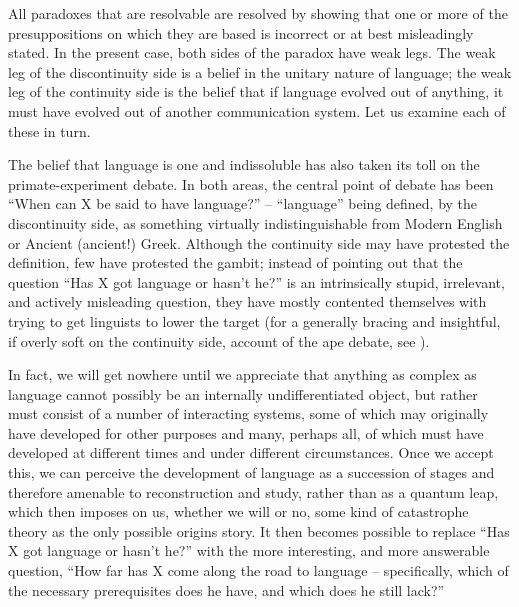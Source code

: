 All paradoxes that are resolvable are resolved by showing that one or more of the presuppositions on which they are based is incorrect or at best misleadingly stated. In the present case, both sides of the paradox have weak legs. The weak leg of the discontinuity side is a belief in the unitary nature of language; the weak leg of the continuity side is the belief that if language evolved out of anything, it must have evolved out of another communication system. Let us examine each of these in turn.

The belief that language is one and indissoluble has also taken its toll on the primate-experiment debate. In both areas, the central point of debate has been ``When can X be said to have language?'' -- ``language'' being defined, by the discontinuity side, as something virtually indistinguishable from Modern English or Ancient (ancient!) Greek. Although the continuity side may have protested the definition, few have protested the gambit; instead of pointing out that the question ``Has X got language or hasn't he?'' is an intrinsically stupid, irrelevant, and actively misleading question, they have mostly contented themselves with trying to get linguists to lower the target (for a generally bracing and insightful, if overly soft on the continuity side, account of the ape debate, see \citealt{Linden1974}).

In fact, we will get nowhere until we appreciate that anything as complex as language cannot possibly be an internally undifferentiated object, but rather must consist of a number of interacting systems,
some of which may originally have developed for other purposes and many, perhaps all, of which must have developed at different times and under different circumstances. Once we accept this, we can per\-ceive the development of language as a succession of stages and there\-fore amenable to reconstruction and study, rather than as a quantum leap, which then imposes on us, whether we will or no, some kind of catastrophe theory as the only possible origins story. It then becomes possible to replace ``Has X got language or hasn't he?'' with the more interesting, and more answerable question, ``How far has X come along the road to language -- specifically, which of the necessary pre\-requisites does he have, and which does he still lack?''


